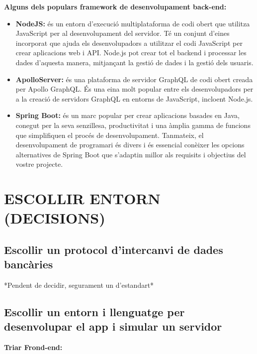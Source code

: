 \documentclass[a4paper,12pt,twoside]{ThesisStyle}
\begin{document}
\textbf{Alguns dels populars framework de desenvolupament back-end:}
\begin{itemize}
    \item \textbf{NodeJS:} és un entorn d'execució multiplataforma de codi obert que utilitza JavaScript per al desenvolupament del servidor. Té un conjunt d'eines incorporat que ajuda els desenvolupadors a utilitzar el codi JavaScript per crear aplicacions web i API. Node.js pot crear tot el backend i processar les dades d'aquesta manera, mitjançant la gestió de dades i la gestió dels usuaris.
    \item \textbf{ApolloServer:} és una plataforma de servidor GraphQL de codi obert creada per Apollo GraphQL. És una eina molt popular entre els desenvolupadors per a la creació de servidors GraphQL en entorns de JavaScript, incloent Node.js.
    \item \textbf{Spring Boot: }és un marc popular per crear aplicacions basades en Java, conegut per la seva senzillesa, productivitat i una àmplia gamma de funcions que simplifiquen el procés de desenvolupament. Tanmateix, el desenvolupament de programari és divers i és essencial conèixer les opcions alternatives de Spring Boot que s'adaptin millor als requisits i objectius del vostre projecte.
\end{itemize}



\section{ESCOLLIR ENTORN (DECISIONS)}


\subsection{Escollir un protocol d'intercanvi de dades bancàries}

*Pendent de decidir, segurament un d'estandart*

\subsection{Escollir un entorn i llenguatge per desenvolupar el app i simular un servidor}








\textbf{Triar Frond-end:}

\vspace{3mm}
\end{document}
